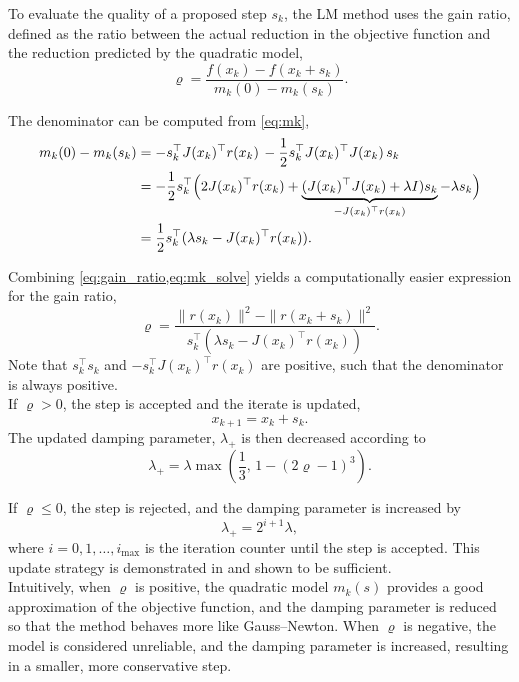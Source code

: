 To evaluate the quality of a proposed step $s_k$, the LM method uses the gain ratio, defined as the ratio between the actual reduction in the objective function and the reduction predicted by the quadratic model,
\begin{equation}
\label{eq:gain_ratio}
\varrho =
\frac{f(x_k) - f(x_k + s_k)}
     {m_k(0) - m_k(s_k)}.
\end{equation}

The denominator can be computed from \cref{eq:mk},
\begin{align}
    m_k(0)-m_k(s_k) &= -s_k^\top J(x_k)^\top r(x_k) \,  - \frac{1}{2} s_k^\top J(x_k)^\top J(x_k) \, s_k \notag \\
    &= -\frac{1}{2} s_k^\top \Big(
    2 J(x_k)^\top r(x_k) + 
    \underbrace{(J(x_k)^\top J(x_k)+\lambda I)s_k}_{-J(x_k)^\top r(x_k)} 
    -\lambda s_k \Big)\notag \\
    &= \frac{1}{2} s_k^\top (\lambda s_k-J(x_k)^\top r(x_k)) \label{eq:mk_solve}.
\end{align}

Combining \cref{eq:gain_ratio,eq:mk_solve} yields a computationally easier expression for the gain ratio,
\begin{equation}
    \label{eq:gain_ratio_solve}
    \varrho = \frac{\|r(x_k)\|^2 - \|r(x_k+s_k)\|^2}
    {s_k^\top (\lambda s_k-J(x_k)^\top r(x_k))}.
\end{equation}
Note that $s_k^\top s_k$ and $-s_k^\top J(x_k)^\top r(x_k)$ are positive, such that the denominator is always positive.\\

If $\varrho > 0$, the step is accepted and the iterate is updated,
\[
x_{k+1} = x_k + s_k.
\]
The updated damping parameter, $\lambda_+$ is then decreased according to
\begin{equation}
\label{eq:dec_lambda}
\lambda_+ = 
\lambda \max \left( \frac{1}{3},\, 1 - (2\varrho - 1)^3 \right).
\end{equation}

If $\varrho \le 0$, the step is rejected, and the damping parameter is increased by
\begin{equation}
\label{eq:inc_lambda}
\lambda_+ = 2^{i+1}\lambda,
\end{equation}
where $i = 0,1,\dots,i_{\max}$ is the iteration counter until the step is accepted. This update strategy is demonstrated in \cite{nielsen1999} and shown to be sufficient.\\

Intuitively, when $\varrho$ is positive, the quadratic model $m_k(s)$ provides a good approximation of the objective function, and the damping parameter is reduced so that the method behaves more like Gauss--Newton. When $\varrho$ is negative, the model is considered unreliable, and the damping parameter is increased, resulting in a smaller, more conservative step.


